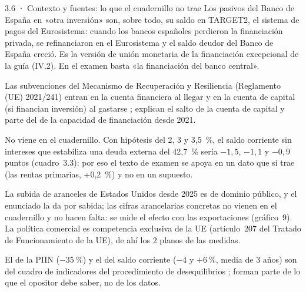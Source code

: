 \begin{complemento}{3.6 · Contexto y fuentes: lo que el cuadernillo no trae}
 Los pasivos del Banco de España en «otra inversión» son, sobre todo, su saldo en TARGET2, el sistema de pagos del Eurosistema: cuando los bancos españoles perdieron la financiación privada, se refinanciaron en el Eurosistema y el saldo deudor del Banco de España creció. Es la versión de unión monetaria de la financiación excepcional de la guía (IV.2). En el examen basta «la financiación del banco central».

 Las subvenciones del Mecanismo de Recuperación y Resiliencia (Reglamento (UE) 2021/241) entran en la cuenta financiera al llegar y en la cuenta de capital (si financian inversión) al gastarse \parencite{BdE2021NGEU}; explican el salto de la cuenta de capital y parte del de la capacidad de financiación desde 2021.

 No viene en el cuadernillo. Con hipótesis del 2, 3 y 3,5~\%, el saldo corriente sin intereses que estabiliza una deuda externa del 42,7~\% sería $-1{,}5$, $-1{,}1$ y $-0{,}9$ puntos (cuadro~3.3): por eso el texto de examen se apoya en un dato que sí trae (las rentas primarias, +0,2~\%) y no en un supuesto.

 La subida de aranceles de Estados Unidos desde 2025 es de dominio público, y el enunciado la da por sabida; las cifras arancelarias concretas no vienen en el cuadernillo y no hacen falta: se mide el efecto con las exportaciones (gráfico~9). La política comercial es competencia exclusiva de la UE (artículo~207 del Tratado de Funcionamiento de la UE), de ahí los 2 planos de las medidas.

 El de la PIIN ($-35~\%$) y el del saldo corriente ($-4$ y $+6~\%$, media de 3 años) son del cuadro de indicadores del procedimiento de desequilibrios \parencite{CE2025AMR2026}; forman parte de lo que el opositor debe saber, no de los datos.
\end{complemento}

